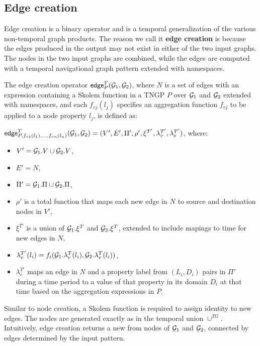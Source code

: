 \subsection{Edge creation}

Edge creation is a binary operator and is a temporal generalization of
the various non-temporal graph products.  The reason we call it {\bf
  edge creation} is because the edges produced in the output may not
exist in either of the two input graphs.  The nodes in the two input
graphs are combined, while the edges are computed with a temporal
navigational graph pattern extended with namespaces.

\begin{definition}
\label{def:edgecr}
The edge creation operator $\textsf{edge}^T_{P}(\mathcal{G}_1,\mathcal{G}_2)$, where
$N$ is a set of edges with an expression containing a Skolem
function in a TNGP $P$ over $\mathcal{G}_1$ and $\mathcal{G}_2$ extended with
namespaces, and each $f_{vj}(l_j)$ specifies an aggregation function
$f_{vj}$ to be applied to a node property $l_j$, is defined as:

$\textsf{edge}^T_{P,f_{v1}(l_1),\ldots,f_{vn}(l_n)}(\mathcal{G}_1,\mathcal{G}_2) = (V',E',\Pi',\rho',\xi^{T'},\lambda^{T'}_v,\lambda^{T'}_e)$, where:

\begin{itemize}[noitemsep,topsep=3pt,itemindent=\dimexpr{}+\relax,leftmargin=5pt]
\item $V' = \mathcal{G}_1.V \cup \mathcal{G}_2.V$,
\item $E' = N$,
\item $\Pi' = \mathcal{G}_1.\Pi \cup \mathcal{G}_2.\Pi$,
\item $\rho'$ is a total function that maps each new edge in $N$ to source and destination nodes in $V'$,
\item $\xi^{T'}$ is a union of $\mathcal{G}_1.\xi^T$ and $\mathcal{G}_2.\xi^T$, extended to include mapings to time for new edges in $N$,
\item $\lambda^{T'}_v(l_i) = f_i(\mathcal{G}_1.\lambda^T_v(l_i), \mathcal{G}_2.\lambda^T_v(l_i))$,
\item $\lambda^{T'}_e$ maps an edge in $N$ and a property label from $(L_i,D_i)$ pairs in $\Pi'$ during a time period to a value of that property in its domain $D_i$ at that time based on the aggregation expressions in $P$.
\end{itemize}
\end{definition}

Similar to node creation, a Skolem function is required to assign
identity to new edges.  The nodes are generated exactly as in the
temporal union $\cup^{TG}$.  Intuitively, edge creation returns a
new \tg from nodes of $\mathcal{G}_1$ and $\mathcal{G}_2$, connected by edges
determined by the input pattern.

